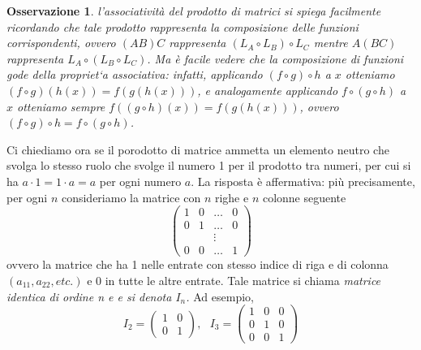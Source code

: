 \documentclass{book}
\newtheorem{osservazione}{Osservazione}
\begin{document}
\begin{osservazione}
  l’associatività del prodotto di matrici si spiega facilmente ricordando che tale
  prodotto rappresenta la composizione delle funzioni corrispondenti, ovvero $(AB)C$ rappresenta
  $(L_A\circ L_B)\circ L_C$ mentre $A(BC)$ rappresenta $L_A\circ (L_B\circ L_C)$. Ma è facile
  vedere che la composizione di funzioni gode della propriet`a associativa: infatti, applicando
  $(f\circ g)\circ h$ a $x$ otteniamo $(f\circ g)(h(x))=f(g(h(x)))$, e analogamente applicando
  $f\circ(g\circ h)$ a $x$ otteniamo sempre $f((g\circ h)(x))=f(g(h(x)))$, ovvero $(f\circ g)
  \circ h= f\circ (g\circ h)$.
\end{osservazione}
Ci chiediamo ora se il porodotto di matrice ammetta un elemento neutro che svolga lo stesso
ruolo che svolge il numero 1 per il prodotto tra numeri, per cui si ha $a \cdot 1 =1 \cdot a=a$
per ogni numero $a$. La risposta è affermativa: più precisamente, per ogni $n$ consideriamo la
matrice con $n$ righe e $n$ colonne seguente
\begin{equation}
  \begin{pmatrix}
    1 & 0 &\dots &0\\
    0 &1 &\dots& 0\\
      && \vdots\\
    0& 0&\dots&1
  \end{pmatrix}
\end{equation}
ovvero la matrice che ha 1 nelle entrate con stesso indice di riga e di colonna $(a_{11},a_{22},etc.)$ e 0 in tutte le altre entrate. Tale matrice si chiama \emph{matrice identica di ordine n e
  e si denota $I_n$.} Ad esempio,
\begin{equation*}
  I_2=
  \begin{pmatrix}
    1 &0\\
    0 &1
  \end{pmatrix}, \text{ }
  I_3=
  \begin{pmatrix}
    1 &0&0\\
    0&1&0\\
    0&0&1
  \end{pmatrix}
\end{equation*}
\end{document}
